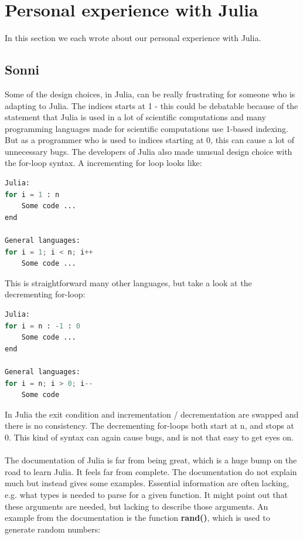 \documentclass[a4paper, 11pt, titlepage]{article}
\begin{document}
\section{Personal experience with Julia}
In this section we each wrote about our personal experience with Julia.
\subsection{Sonni}
Some of the design choices, in Julia, can be really frustrating for someone who is adapting to Julia. The indices starts at 1 - this could be debatable because of the statement that Julia is used in a lot of scientific computations and many programming languages made for scientific computations use 1-based indexing. But as a programmer who is used to indices starting at 0, this can cause a lot of unnecessary bugs. The developers of Julia also made unusual design choice with the for-loop syntax. A incrementing for loop looks like:
\begin{lstlisting}[language=python]
Julia:
for i = 1 : n
	Some code ...
end

General languages:
for i = 1; i < n; i++
	Some code ...
\end{lstlisting}
This is straightforward many other languages, but take a look at the decrementing for-loop:
\begin{lstlisting}[language=python]
Julia:
for i = n : -1 : 0
	Some code ...
end

General languages:
for i = n; i > 0; i--
	Some code
\end{lstlisting}
In Julia the exit condition and incrementation / decrementation are swapped and there is no consistency. The decrementing for-loops both start at n, and stops at 0. This kind of syntax can again cause bugs, and is not that easy to get eyes on.\\
\\
The documentation of Julia is far from being great, which is a huge bump on the road to learn Julia. It feels far from complete. The documentation do not explain much but instead gives some examples. Essential information are often lacking, e.g. what types is needed to parse for a given function. It might point out that these arguments are needed, but lacking to describe those arguments. An example from the documentation is the function \textbf{rand()}, which is used to generate random numbers:
\end{document}
